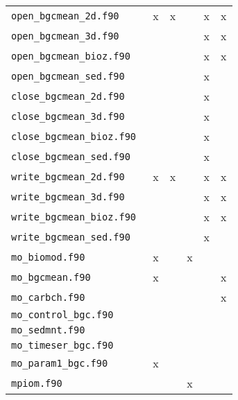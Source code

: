 \documentclass[11pt,a4paper,fleqn,twoside]{article}
\begin{document}
\begin{appendix}
\begin{tabular}{|l|c|c|c|c|c|}
{\tt  open\_bgcmean\_2d.f90 }   &     x     &    x         &                    &       x       &        x          \\ 
{\tt  open\_bgcmean\_3d.f90 }   &           &              &                    &       x       &        x          \\
{\tt  open\_bgcmean\_bioz.f90 } &           &              &                    &       x       &        x          \\
{\tt  open\_bgcmean\_sed.f90 }  &           &              &                    &       x       &                   \\
{\tt  close\_bgcmean\_2d.f90 }  &           &              &                    &       x       &                   \\ 
{\tt  close\_bgcmean\_3d.f90 }  &           &              &                    &       x       &                   \\
{\tt  close\_bgcmean\_bioz.f90 }&           &              &                    &       x       &                   \\
{\tt  close\_bgcmean\_sed.f90 } &           &              &                    &       x       &                   \\
{\tt  write\_bgcmean\_2d.f90 }  &     x     &    x         &                    &       x       &        x          \\ 
{\tt  write\_bgcmean\_3d.f90 }  &           &              &                    &       x       &        x          \\
{\tt  write\_bgcmean\_bioz.f90 }&           &              &                    &       x       &        x          \\
{\tt  write\_bgcmean\_sed.f90 } &           &              &                    &       x       &                   \\\hline
{\tt mo\_biomod.f90      }      &     x     &              &         x          &               &                   \\
{\tt mo\_bgcmean.f90      }     &     x     &              &                    &               &        x          \\
{\tt mo\_carbch.f90      }      &           &              &                    &               &        x          \\
{\tt mo\_control\_bgc.f90 }     &           &              &                    &               &                   \\
{\tt mo\_sedmnt.f90      }      &           &              &                    &               &                   \\
{\tt mo\_timeser\_bgc.f90 }     &           &              &                    &               &                   \\
{\tt mo\_param1\_bgc.f90    }   &     x     &              &                    &               &                   \\ \hline
{\tt mpiom.f90    }             &           &              &         x          &               &                   \\ \hline
\end{tabular}
\normalsize



\end{appendix}
\end{document}
